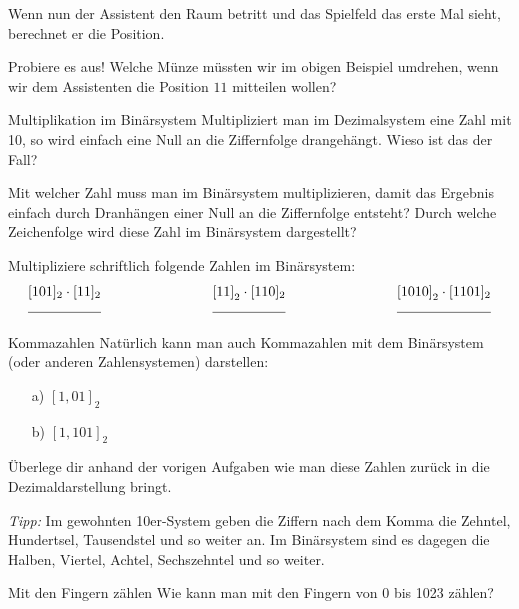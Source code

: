 \documentclass{../../../zirkelblatt}
\begin{document}
Wenn nun der Assistent den Raum betritt und das Spielfeld das erste Mal sieht,
berechnet er die Position.

\begin{aufgabe}{Probiere es aus!}
Welche Münze müssten wir im obigen Beispiel umdrehen,
wenn wir dem Assistenten die Position $11$ mitteilen wollen?
\end{aufgabe}

\pagebreak

\begin{aufgabe}{Multiplikation im Binärsystem}
Multipliziert man im Dezimalsystem eine Zahl mit 10, so wird einfach eine Null
an die Ziffernfolge drangehängt. Wieso ist das der Fall?

Mit welcher Zahl muss man im Binärsystem multiplizieren, damit das Ergebnis
einfach durch Dranhängen einer Null an die Ziffernfolge entsteht? Durch welche
Zeichenfolge wird diese Zahl im Binärsystem dargestellt?

Multipliziere schriftlich folgende Zahlen im Binärsystem:
\[\begin{array}{rrrrrrrrr}
[101]_{2} \cdot [11]_2 & \quad \quad \quad \quad \quad \quad & \left[ 11 \right]_2 \cdot [110]_2 & \quad \quad \quad \quad \quad \quad & \left[ 1010 \right]_2 \cdot [1101]_2 \\
\hrulefill & & \hrulefill & & \hrulefill
\end{array}\]
\vspace{2cm}
\end{aufgabe}

\begin{aufgabe}{Kommazahlen}
Natürlich kann man auch Kommazahlen mit dem Binärsystem (oder anderen Zahlensystemen) darstellen:
\begin{itemize}
\item [a)] $\left[ 1{,}01 \right]_{2}$
\item [b)] $\left[ 1{,}101 \right]_{2}$
\end{itemize}
Überlege dir anhand der vorigen Aufgaben wie man diese Zahlen zurück in die
Dezimaldarstellung bringt.

\emph{Tipp:} Im gewohnten 10er-System geben die Ziffern nach dem Komma die
Zehntel, Hundertsel, Tausendstel und so weiter an. Im Binärsystem sind
es dagegen die Halben, Viertel, Achtel, Sechszehntel und so weiter.
\end{aufgabe}

\vspace{5 cm}

\begin{aufgabe}{Mit den Fingern zählen}
Wie kann man mit den Fingern von 0 bis 1023 zählen?
\end{aufgabe}
\end{document}
